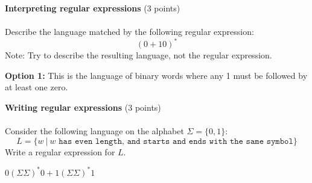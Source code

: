 \documentclass[12pt]{article}
\newenvironment{question}[2][Question]{\begin{trivlist}
\item[\hskip \labelsep {\bfseries #1}\hskip \labelsep {\bfseries #2.}]}{\end{trivlist}}
\newenvironment{solution}[1][Solution:]{\begin{trivlist}
\item[\hskip \labelsep {\bfseries #1}\hskip \labelsep {\bfseries}]\color{blue}}{\end{trivlist}}
\begin{document}
\clearpage
\begin{question}{2}\textbf{Interpreting regular expressions} (3 points)\\\\
Describe the language matched by the following regular expression:
\[ (0 + 10 )^*\]
Note: Try to describe the resulting language, not the regular expression.
\end{question}

\begin{solution}
\;

    \textbf{Option 1:} This is the language of binary words where any 1 must be followed by at least one zero.
\end{solution}

\begin{question}{3}\textbf{Writing regular expressions} (3 points)\\\\
Consider the following language on the alphabet $\Sigma = \{0,1\}$:
\[L = \{w \ | \ w \texttt{ has even length, and starts and ends with the same symbol}\}\]
Write a regular expression for $L$.
\end{question}

\begin{solution}
$0(\Sigma\Sigma)^*0 + 1(\Sigma\Sigma)^*1$
\end{solution}
\end{document}
